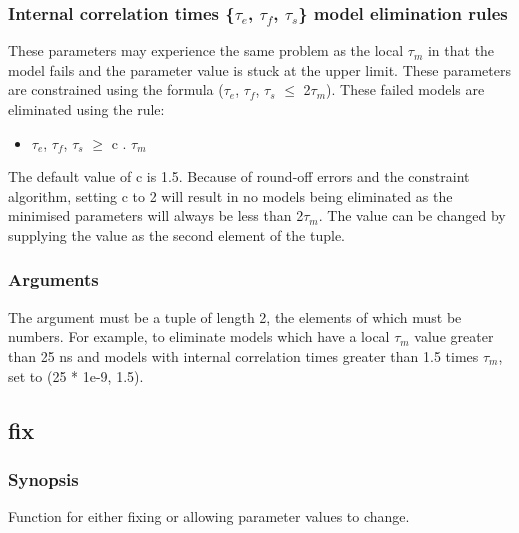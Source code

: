 \subsubsection{Internal correlation times \{$\tau_e$, $\tau_f$, $\tau_s$\} model elimination rules}

These parameters may experience the same problem as the local $\tau_m$ in that the model fails and the parameter value is stuck at the upper limit.  These parameters are constrained using the formula ($\tau_e$, $\tau_f$, $\tau_s$ $\le$ 2$\tau_m$).  These failed models are eliminated using the rule:


\begin{itemize}
\item[] $\tau_e$, $\tau_f$, $\tau_s$ $\ge$ c . $\tau_m$ 
\end{itemize}


The default value of c is 1.5.  Because of round-off errors and the constraint algorithm, setting c to 2 will result in no models being eliminated as the minimised parameters will always be less than 2$\tau_m$.  The value can be changed by supplying the value as the second element of the tuple.



\subsubsection{Arguments}

The  argument must be a tuple of length 2, the elements of which must be numbers.  For example, to eliminate models which have a local $\tau_m$ value greater than 25 ns and models with internal correlation times greater than 1.5 times $\tau_m$, set  to (25 * 1e-9, 1.5).




\newpage

\subsection{fix}


\subsubsection{Synopsis}

Function for either fixing or allowing parameter values to change.



